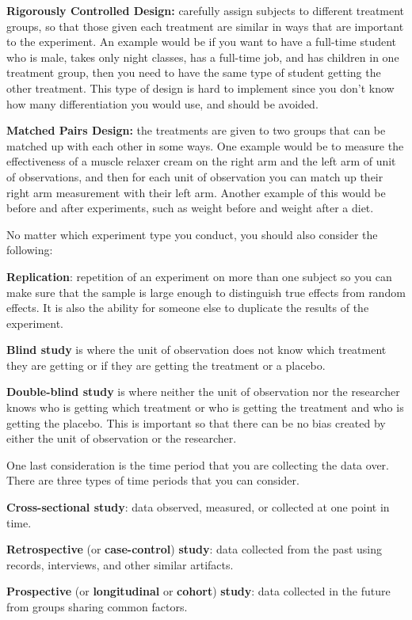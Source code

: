 \documentclass[]{book}
\begin{document}
\textbf{Rigorously Controlled Design:} carefully assign subjects to different treatment groups, so that those given each treatment are similar in ways that are important to the experiment. An example would be if you want to have a full-time student who is male, takes only night classes, has a full-time job, and has children in one treatment group, then you need to have the same type of student getting the other treatment. This type of design is hard to implement since you don't know how many differentiation you would use, and should be avoided.

\textbf{Matched Pairs Design:} the treatments are given to two groups that can be matched up with each other in some ways. One example would be to measure the effectiveness of a muscle relaxer cream on the right arm and the left arm of unit of observations, and then for each unit of observation you can match up their right arm measurement with their left arm. Another example of this would be before and after experiments, such as weight before and weight after a diet.

No matter which experiment type you conduct, you should also consider the following:

\textbf{Replication}: repetition of an experiment on more than one subject so you can make sure that the sample is large enough to distinguish true effects from random effects. It is also the ability for someone else to duplicate the results of the experiment.

\textbf{Blind study} is where the unit of observation does not know which treatment they are getting or if they are getting the treatment or a placebo.

\textbf{Double-blind study} is where neither the unit of observation nor the
researcher knows who is getting which treatment or who is getting the treatment and who is getting the placebo. This is important so that there can be no bias created by either the unit of observation or the researcher.

One last consideration is the time period that you are collecting the data over. There are three types of time periods that you can consider.

\textbf{Cross-sectional study}: data observed, measured, or collected at one point in time.

\textbf{Retrospective} (or \textbf{case-control}) \textbf{study}: data collected from the past using records, interviews, and other similar artifacts.

\textbf{Prospective} (or \textbf{longitudinal} or \textbf{cohort}) \textbf{study}: data collected in the future from groups sharing common factors.
\end{document}
